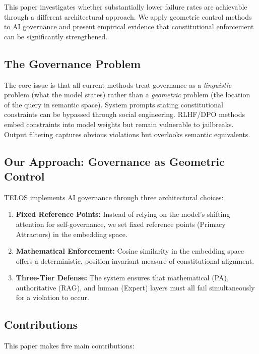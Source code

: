 \documentclass[11pt,twocolumn]{article}
\begin{document}
This paper investigates whether substantially lower failure rates are achievable through a different architectural approach. We apply geometric control methods to AI governance and present empirical evidence that constitutional enforcement can be significantly strengthened.

\subsection{The Governance Problem}

The core issue is that all current methods treat governance as a \emph{linguistic} problem (what the model states) rather than a \emph{geometric} problem (the location of the query in semantic space). System prompts stating constitutional constraints can be bypassed through social engineering. RLHF/DPO methods embed constraints into model weights but remain vulnerable to jailbreaks. Output filtering captures obvious violations but overlooks semantic equivalents.

\subsection{Our Approach: Governance as Geometric Control}

TELOS implements AI governance through three architectural choices:

\begin{enumerate}
    \item \textbf{Fixed Reference Points:} Instead of relying on the model's shifting attention for self-governance, we set fixed reference points (Primacy Attractors) in the embedding space.
    \item \textbf{Mathematical Enforcement:} Cosine similarity in the embedding space offers a deterministic, position-invariant measure of constitutional alignment.
    \item \textbf{Three-Tier Defense:} The system ensures that mathematical (PA), authoritative (RAG), and human (Expert) layers must all fail simultaneously for a violation to occur.
\end{enumerate}

\subsection{Contributions}

This paper makes five main contributions:
\end{document}
